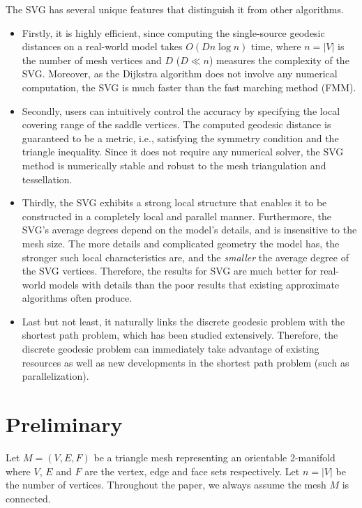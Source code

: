 The SVG has several unique features that distinguish it from other
algorithms.
\begin{itemize}

\item Firstly, it is highly efficient, since computing the single-source geodesic distances on a real-world model takes $O(Dn\log n)$ time,
where $n=|V|$ is the number of mesh vertices and $D$ ($D\ll n$)
measures the complexity of the SVG. Moreover, as the Dijkstra
algorithm does not involve any numerical computation, the SVG is
much faster than the fast marching method (FMM).

\item Secondly, users can intuitively control the accuracy by
specifying the local covering range of the saddle vertices. The
computed geodesic distance is guaranteed to be a metric, i.e.,
satisfying the symmetry condition and the triangle inequality. Since
it does not require any numerical solver, the SVG method is
numerically stable and robust to the mesh triangulation and
tessellation.

\item Thirdly, the SVG exhibits a strong local structure that enables it to be constructed in a completely local and parallel manner. Furthermore,
the SVG's average degrees depend on the model's details, and is
insensitive to the mesh size. The more details and complicated
geometry the model has, the stronger such local characteristics are,
and the \textit{smaller} the average degree of the SVG vertices.
Therefore, the results for SVG are much better for real-world models
with details than the poor results that existing approximate
algorithms often produce.

\item Last but not least, it naturally links the discrete
geodesic problem with the shortest path problem, which has been
studied extensively. Therefore, the discrete geodesic problem can
immediately take advantage of existing resources as well as new
developments in the shortest path problem (such as parallelization).
\end{itemize}

\section{Preliminary}
\label{sec:preliminary} Let $M=(V,E,F)$ be a triangle mesh
representing an orientable 2-manifold where $V$, $E$ and $F$ are the
vertex, edge and face sets respectively. Let $n=|V|$ be the number
of vertices. Throughout the paper, we always assume the mesh $M$ is
connected.

